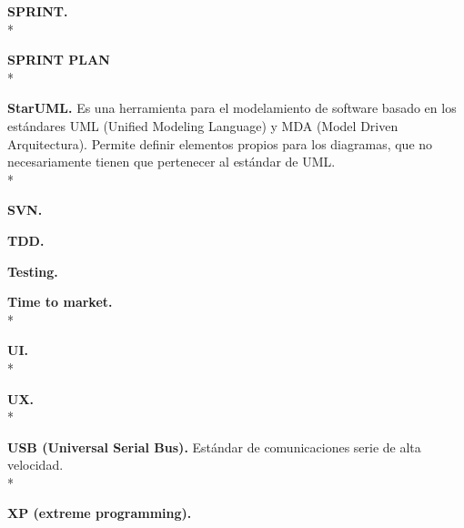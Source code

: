 \documentclass[../pfc.tex]{subfiles}
\begin{document}
	
	\textbf{SPRINT.}\\*
	
	\textbf{SPRINT PLAN}\\*
	
	\textbf{StarUML.}
	Es una herramienta para el modelamiento de software basado en los estándares UML (Unified Modeling Language) y MDA (Model Driven Arquitectura). Permite definir elementos propios para los diagramas, que no necesariamente tienen que pertenecer al estándar de UML.\\*
	
	\textbf{SVN.}
	
	\textbf{TDD.}
	
	\textbf{Testing.}
	
	\textbf{Time to market.}\\*
	
	\textbf{UI.}\\*
	
	\textbf{UX.}\\*
	
	\textbf{USB (Universal Serial Bus).}
	Estándar de comunicaciones serie de alta velocidad. \\*
	
	\textbf{XP (extreme programming).}

	
\end{document}
